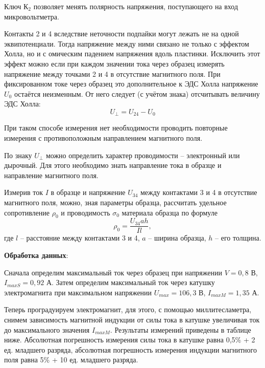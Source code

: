 \documentclass[a4paper,12pt]{article}
\begin{document}
Ключ $К_2$ позволяет менять полярность напряжения, поступающего на вход микровольтметра.

Контакты 2 и 4 вследствие неточности подпайки могут лежать не на
одной эквипотенциали. Тогда напряжение между ними связано не только с эффектом Холла, но и с омическим падением напряжения вдоль пластинки. Исключить этот эффект можно если при каждом значении тока через образец измерять напряжение между точками 2 и 4 в отсутствие магнитного поля. При фиксированном токе через образец это дополнительное к ЭДС Холла напряжение $U_0$ остаётся неизменным. От него следует (с учётом знака) отсчитывать величину ЭДС Холла: 
\[U_{\perp} = U_{24} - U_0\]

При таком способе измерения нет необходимости проводить повторные измерения с противоположным направлением магнитного поля.

По знаку $U_{\perp}$ можно определить характер проводимости -- электронный или дырочный. Для этого необходимо знать направление тока в образце и направление магнитного поля.

Измерив ток $I$ в образце и напряжение $U_{34}$ между контактами 3 и 4
в отсутствие магнитного поля, можно, зная параметры образца, рассчитать удельное сопротивление $\rho_0$ и проводимость $\sigma_0$ материала образца по формуле
\[\rho_0 = \frac{U_{34} a h }{I l},\]
где $l$ -- расстояние между контактами 3 и 4, $a$ -- ширина образца, $h$ --
его толщина.


\textbf{Обработка данных}:  

Сначала определим максимальный ток через образец при напряжении $V = 0,8$ В, $I_{maxS} = 0,92$ А. Затем определим максимальный ток через катушку электромагнита при максимальном напряжении $U_{max} = 106,3$ В, $I_{maxM} = 1,35$ А.

Теперь проградуируем электромагнит, для этого, с помощью миллитесламетра, снимем зависимость магнитной индукции от силы тока в катушке увеличивая ток до максимального значения $I_{maxM}$. Результаты измерений приведены в таблице ниже. Абсолютная погрешность измерения силы тока в катушке равна 0,5\% + 2 ед. младшего разряда, абсолютная погрешность измерения индукции магнитного поля равна 5\% + 10 ед. младшего разряда.
\end{document}
